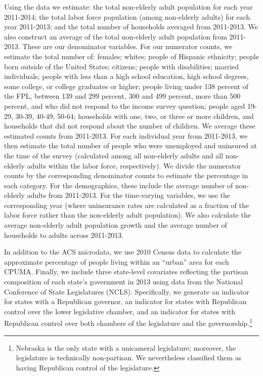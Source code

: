 \documentclass[aoas]{imsart}
\theoremstyle{plain}
\theoremstyle{remark}
\begin{document}
Using the data we estimate: the total non-elderly adult population for each year 2011-2014; the total labor force population (among non-elderly adults) for each year 2011-2013; and the total number of households averaged from 2011-2013. We also construct an average of the total non-elderly adult population from 2011-2013. These are our denominator variables. For our numerator counts, we estimate the total number of: females; whites; people of Hispanic ethnicity; people born outside of the United States; citizens; people with disabilities; married individuals; people with less than a high school education, high school degrees, some college, or college graduates or higher; people living under 138 percent of the FPL, between 139 and 299 percent, 300 and 499 percent, more than 500 percent, and who did not respond to the income survey question; people aged 19-29, 30-39, 40-49, 50-64; households with one, two, or three or more children, and households that did not respond about the number of children. We average these estimated counts from 2011-2013. For each individual year from 2011-2013, we then estimate the total number of people who were unemployed and uninsured at the time of the survey (calculated among all non-elderly adults and all non-elderly adults within the labor force, respectively). We divide the numerator counts by the corresponding denominator counts to estimate the percentage in each category. For the demographics, these include the average number of non-elderly adults from 2011-2013. For the time-varying variables, we use the corresponding year (where uninsurance rates are calculated as a fraction of the labor force rather than the non-elderly adult population). We also calculate the average non-elderly adult population growth and the average number of households to adults across 2011-2013. 

In addition to the ACS microdata, we use 2010 Census data to calculate the approximate percentage of people living within an ``urban'' area for each CPUMA. Finally, we include three state-level covariates reflecting the partisan composition of each state's government in 2013 using data from the National Conference of State Legislatures (NCLS). Specifically, we generate an indicator for states with a Republican governor, an indicator for states with Republican control over the lower legislative chamber, and an indicator for states with Republican control over both chambers of the legislature and the governorship.\footnote{Nebraska is the only state with a unicameral legislature; moreover, the legislature is technically non-partisan. We nevertheless classified them as having Republican control of the legislature.} 
\end{document}
